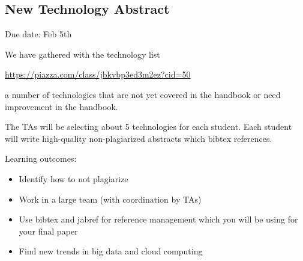 \subsection{New Technology Abstract}
\label{E:616-new-tech-abstract}

\begin{exercise} 
 
Due date: Feb 5th

We have gathered with the technology list 

\url{https://piazza.com/class/jbkvbp3ed3m2ez?cid=50}

a number of technologies that are not yet covered in the handbook or
need improvement in the handbook.

The TAs will be selecting about 5 technologies for each student. Each
student will write high-quality non-plagiarized abstracts which bibtex
references.
 
Learning outcomes:

\begin{itemize}

\item Identify how to not plagiarize
\item Work in a large team (with coordination by TAs)
\item Use bibtex and jabref for reference management which you will be using for your final paper
\item Find new trends in big data and cloud computing

\end{itemize}

\end{exercise}


